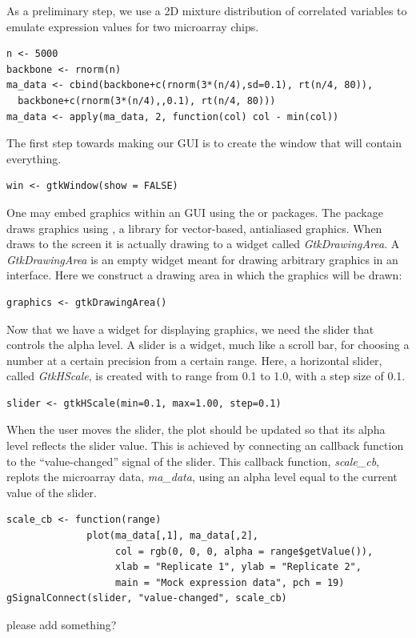 \documentclass[article]{jss}
\begin{document}
As a preliminary step, we use a 2D mixture distribution of correlated
variables
to emulate expression values for two microarray chips. 
\begin{verbatim}
n <- 5000
backbone <- rnorm(n)
ma_data <- cbind(backbone+c(rnorm(3*(n/4),sd=0.1), rt(n/4, 80)), 
  backbone+c(rnorm(3*(n/4),,0.1), rt(n/4, 80)))
ma_data <- apply(ma_data, 2, function(col) col - min(col))
\end{verbatim}

The first step towards making our GUI is to create the window that
will contain everything. 
\begin{verbatim}
win <- gtkWindow(show = FALSE)
\end{verbatim}

One may embed  graphics within an  GUI using
the 
 \citep{cairoDevice} or 
\citep{gtkDevice}
packages. The  package draws  graphics
using 
 \citep{cairo}, a library for vector-based, antialiased
graphics.
When  draws to the screen it is actually drawing to a 
 widget called \emph{GtkDrawingArea}. A
\emph{GtkDrawingArea}
is an empty widget meant for drawing arbitrary graphics in an
interface. Here we 
construct a drawing area in which the  graphics will be
drawn:
\begin{verbatim}
graphics <- gtkDrawingArea()
\end{verbatim}

Now that we have a widget for displaying  graphics, we
need the slider that controls the alpha level. A slider is a widget,
much like a scroll bar, for choosing a number at a certain precision
from a certain range. Here, a horizontal slider, called
\emph{GtkHScale}, is created with to range from 0.1 to 1.0, with a
step size of 0.1.
\begin{verbatim}
slider <- gtkHScale(min=0.1, max=1.00, step=0.1)
\end{verbatim}

When the user moves the slider, the plot should be updated so that its
alpha
level reflects the slider value. This is achieved by connecting
an  callback function to the ``value-changed'' signal of
the slider. 
This callback function, \emph{scale\_cb}, replots the microarray data,
\emph{ma\_data}, using
an alpha level equal to the current value of the slider. 
\begin{verbatim}
scale_cb <- function(range) 
              plot(ma_data[,1], ma_data[,2], 
                   col = rgb(0, 0, 0, alpha = range$getValue()),
                   xlab = "Replicate 1", ylab = "Replicate 2", 
                   main = "Mock expression data", pch = 19)
gSignalConnect(slider, "value-changed", scale_cb)
\end{verbatim}
please add something?
\end{document}
